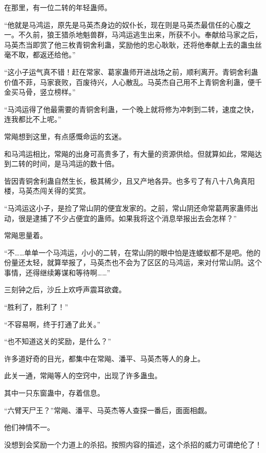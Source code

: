 \begin{this_body}
在那里，有一位二转的年轻蛊师。

“他就是马鸿运，原先是马英杰身边的奴仆长，现在则是马英杰最信任的心腹之一。不久前，狼王猎杀地魁兽群，马鸿运逃生出来，所获不小。奉献给马家之后，马英杰当即赏了他三枚青铜舍利蛊，奖励他的忠心耿耿，还将他奉献上去的蛊虫丝毫不取，都返还给他。”

“这小子运气真不错！赶在常家、葛家蛊师开进战场之前，顺利离开。青铜舍利蛊价值不菲，马家衰败，百废待兴，人心散乱。马英杰自己用不上青铜舍利蛊，便千金买马骨，竖立榜样。”

“马鸿运得了他最需要的青铜舍利蛊，一个晚上就将修为冲刺到二转，速度之快，连我都比不上呢。”

常飚想到这里，有点感慨命运的玄迷。

和马鸿运相比，常飚的出身可高贵多了，有大量的资源供给。但就算如此，常飚达到二转的时间，是马鸿运的数十倍。

皆因青铜舍利蛊自然生长，极其稀少，且又产地各异。也多亏了有八十八角真阳楼，马英杰闯关得的奖赏。

“马鸿运这小子，是捡了常山阴的便宜发家的。之前，常山阴还命常葛两家蛊师出动，很是逮捕了不少占便宜的蛊师。如果我将这个消息举报出去会怎样？”

常飚思量着。

“不……单单一个马鸿运，小小的二转，在常山阴的眼中怕是连蝼蚁都不是吧。他的份量还太轻，就算举报了，马英杰也不会为了区区的马鸿运，来对付常山阴。这个事情，还得继续筹谋和等待啊……”

三刻钟之后，沙丘上欢呼声震耳欲聋。

“胜利了，胜利了！”

“不容易啊，终于打通了此关。”

“也不知道这关的奖励，是什么？”

许多道好奇的目光，都集中在常飚、潘平、马英杰等人的身上。

此关一通，常飚等人的空窍中，出现了许多蛊虫。

其中一只东窗蛊中，存着信息。

“六臂天尸王？”常飚、潘平、马英杰等人查探一番后，面面相觑。

他们神情不一。

没想到会奖励一个力道上的杀招。按照内容的描述，这个杀招的威力可谓绝伦了！

\end{this_body}

